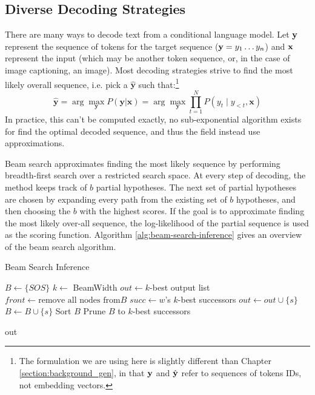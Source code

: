 \subsection{Diverse Decoding Strategies}
There are many ways to decode text from a conditional language model.
Let $\mathbf{y}$ represent the sequence of tokens for the target sequence ($\mathbf{y} = y_1 \ldots y_n$) and $\mathbf{x}$ represent the input (which may be another token sequence, or, in the case of image captioning, an image).
Most decoding strategies strive to find the most likely overall sequence, i.e. pick a $\mathbf{\hat{y}}$ such that:\footnote{The formulation we are using here is slightly different than Chapter \ref{section:background_gen}, in that $\mathbf{y}$ and $\hat{\mathbf{y}}$ refer to sequences of tokens IDs, not embedding vectors.}
\[
    \mathbf{\hat{y}} = \arg\max_{\mathbf{y}}{ P(\mathbf{y} | \mathbf{x})} = \arg\max_{\mathbf{y}}{\prod_{t=1}^{N} {P(y_t \mid y_{<t}, \mathbf{x})}}
\]
In practice, this can't be computed exactly, no sub-exponential algorithm exists for find the optimal decoded sequence, and thus the field instead use approximations.

Beam search approximates finding the most likely sequence by performing breadth-first search over a restricted search space.
At every step of decoding, the method keeps track of $b$ partial hypotheses.
The next set of partial hypotheses are chosen by expanding every path from the existing set of $b$ hypotheses, and then choosing the $b$ with the highest scores.
If the goal is to approximate finding the most likely over-all sequence, the log-likelihood of the partial sequence is used as the scoring function.
Algorithm \ref{alg:beam-search-inference} gives an overview of the beam search algorithm. 

\begin{algorithm}
\caption{Beam Search Inference}
\label{alg:beam-search-inference}

\begin{algorithmic}[1]
\State $B \gets \{SOS\}$
\State $k \gets $ BeamWidth
\State $out \gets k$-best output list
    \State $front \gets \text{remove all nodes from} B$
    \State $succ \gets w$'s $k$-best successors
        \State $out \gets out \cup \{s\}$
    \Else
        \State $B \gets B \cup \{s\}$
    \EndIf
    \EndFor
    \EndFor
    \State Sort $B$
        \State Prune $B$ to $k$-best successors
    \EndIf
\EndWhile

\Return out
\EndProcedure
\end{algorithmic}
\end{algorithm}

